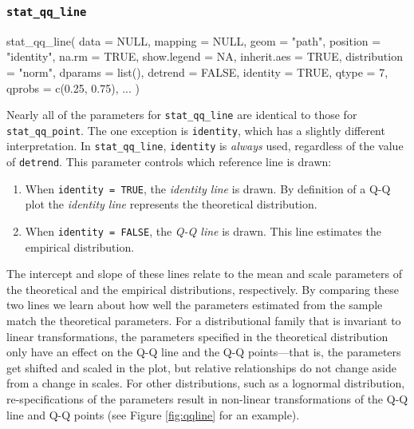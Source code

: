 \subsubsection{\texorpdfstring{\texttt{stat\_qq\_line}}{stat\_qq\_line}}\label{stat_qq_line}


\begin{Schunk}
\begin{Sinput}
stat_qq_line(
  data = NULL,
  mapping = NULL,
  geom = "path",
  position = "identity",
  na.rm = TRUE,
  show.legend = NA,
  inherit.aes = TRUE,
  distribution = "norm",
  dparams = list(),
  detrend = FALSE,
  identity = TRUE,
  qtype = 7,
  qprobs = c(0.25, 0.75),
  ...
  )
\end{Sinput}
\end{Schunk}

Nearly all of the parameters for \texttt{stat\_qq\_line} are identical
to those for \texttt{stat\_qq\_point}. The one exception is
\texttt{identity}, which has a slightly different interpretation. In
\texttt{stat\_qq\_line}, \texttt{identity} is \emph{always} used,
regardless of the value of \texttt{detrend}. This parameter controls
which reference line is drawn:

\begin{enumerate}
\def\labelenumi{\alph{enumi})}
\tightlist
\item
  When \texttt{identity\ =\ TRUE}, the \emph{identity line} is drawn. By
  definition of a Q-Q plot the \emph{identity line} represents the
  theoretical distribution.
\item
  When \texttt{identity\ =\ FALSE}, the \emph{Q-Q line} is drawn. This
  line estimates the empirical distribution.
\end{enumerate}

The intercept and slope of these lines relate to the mean and scale
parameters of the theoretical and the empirical distributions,
respectively. By comparing these two lines we learn about how well the
parameters estimated from the sample match the theoretical parameters.
For a distributional family that is invariant to linear transformations,
the parameters specified in the theoretical distribution only have an
effect on the Q-Q line and the Q-Q points---that is, the parameters get
shifted and scaled in the plot, but relative relationships do not change
aside from a change in scales. For other distributions, such as a
lognormal distribution, re-specifications of the parameters result in
non-linear transformations of the Q-Q line and Q-Q points (see Figure
\ref{fig:qqline} for an example).

